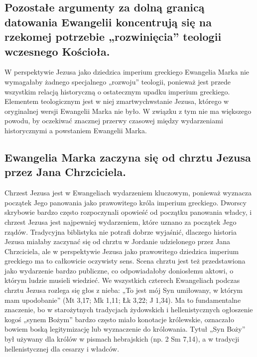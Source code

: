 \subsection{Pozostałe argumenty za dolną granicą datowania Ewangelii koncentrują się na rzekomej potrzebie „rozwinięcia” teologii wczesnego Kościoła.}\label{subsec:the-other-arguments-for-the-lower-bound-of-the-dating-of-the-gospels-focus-on-the-need-to-develop-the-theology-of-the-early-church.}

W perspektywie Jezusa jako dziedzica imperium greckiego Ewangelia Marka nie wymagałaby żadnego specjalnego „rozwoju” teologii, ponieważ jest przede wszystkim relacją historyczną o ostatecznym upadku imperium greckiego.
Elementem teologicznym jest w niej zmartwychwstanie Jezusa, którego w oryginalnej wersji Ewangelii Marka nie było.
W związku z tym nie ma większego powodu, by oczekiwać znacznej przerwy czasowej między wydarzeniami historycznymi a powstaniem Ewangelii Marka.

\subsection{Ewangelia Marka zaczyna się od chrztu Jezusa przez Jana Chrzciciela.}

\label{subsec:the-gospel-of-mark-starts-with-the-baptism-of-jesus-by-john-the-baptist.}

Chrzest Jezusa jest w Ewangeliach wydarzeniem kluczowym, ponieważ wyznacza początek Jego panowania jako prawowitego króla imperium greckiego.
Dworscy skrybowie bardzo często rozpoczynali opowieść od początku panowania władcy, i chrzest Jezusa jest najpewniej wydarzeniem, które uznano za początek Jego rządów.
Tradycyjna biblistyka nie potrafi dobrze wyjaśnić, dlaczego historia Jezusa miałaby zaczynać się od chrztu w Jordanie udzielonego przez Jana Chrzciciela, ale w perspektywie Jezusa jako prawowitego dziedzica imperium greckiego ma to całkowicie oczywisty sens.
Scena chrztu jest też przedstawiona jako wydarzenie bardzo publiczne, co odpowiadałoby doniosłemu aktowi, o którym ludzie musieli wiedzieć.
We wszystkich czterech Ewangeliach podczas chrztu Jezusa rozlega się głos z nieba: „To jest mój Syn umiłowany, w którym mam upodobanie” (Mt 3,17; Mk 1,11; Łk 3,22; J 1,34).
Ma to fundamentalne znaczenie, bo w starożytnych tradycjach żydowskich i hellenistycznych ogłoszenie kogoś „synem Bożym” bardzo często miało konotacje królewskie, oznaczało bowiem boską legitymizację lub wyznaczenie do królowania.
Tytuł „Syn Boży” był używany dla królów w pismach hebrajskich (np. 2 Sm 7,14), a w tradycji hellenistycznej dla cesarzy i władców.

